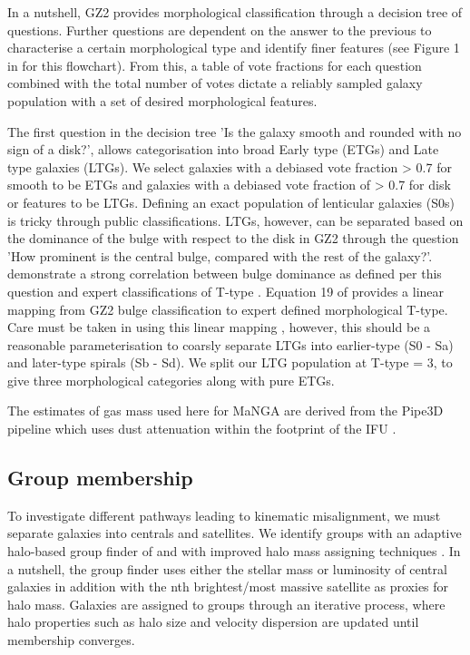 \documentclass[fleqn,usenatbib]{mnras}
\begin{document}
In a nutshell, GZ2 provides morphological classification through a decision tree of questions. Further questions are dependent on the answer to the previous to characterise a certain morphological type and identify finer features (see Figure 1 in \citet{willett2013} for this flowchart). From this, a table of vote fractions for each question combined with the total number of votes dictate a reliably sampled galaxy population with a set of desired morphological features. 

The first question in the decision tree 'Is the galaxy smooth and rounded with no sign of a disk?', allows categorisation into broad Early type (ETGs) and Late type galaxies (LTGs). We select galaxies with a debiased vote fraction > 0.7 for smooth to be ETGs and galaxies with a debiased vote fraction of > 0.7 for disk or features to be LTGs. Defining an exact population of lenticular galaxies (S0s) is tricky through public classifications. LTGs, however, can be separated based on the dominance of the bulge with respect to the disk in GZ2 through the question 'How prominent is the central bulge, compared with the rest of the galaxy?'. \citet{willett2013} demonstrate a strong correlation between bulge dominance as defined per this question and expert classifications of T-type \citep{nair2010}. Equation 19 of \citet{willett2013} provides a linear mapping from GZ2 bulge classification to expert defined morphological T-type. Care must be taken in using this linear mapping \citep[see discussion in][]{willett2013}, however, this should be a reasonable parameterisation to coarsly separate LTGs into earlier-type (S0 - Sa) and later-type spirals (Sb - Sd). We split our LTG population at T-type = 3, to give three morphological categories along with pure ETGs. 

The estimates of gas mass used here for MaNGA are derived from the Pipe3D pipeline which uses dust attenuation within the footprint of the IFU \citep{pipe3Da, pipe3Dvac}.

\subsection{Group membership} \label{sec:group_def}
To investigate different pathways leading to kinematic misalignment, we must separate galaxies into centrals and satellites. We identify groups with an adaptive halo-based group finder of \citet{yang2005,yang2007} and with improved halo mass assigning techniques \citep[see;][for details and application to SDSS]{lim2017}. In a nutshell, the group finder uses either the stellar mass or luminosity of central galaxies in addition with the nth brightest/most massive satellite as proxies for halo mass. Galaxies are assigned to groups through an iterative process, where halo properties such as halo size and velocity dispersion are updated until membership converges. 
\end{document}
